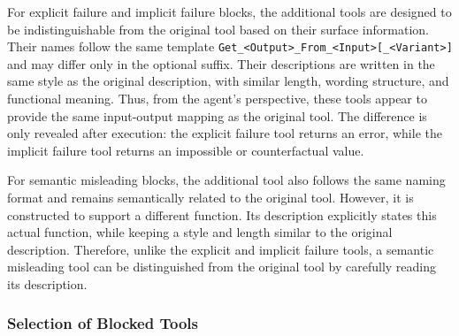 \documentclass{llmxive}
\begin{document}
For explicit failure and implicit failure blocks, the additional tools are designed to be indistinguishable from the original tool based on their surface information. 
Their names follow the same template \texttt{Get\_<Output>\_From\_<Input>[\_<Variant>]} and may differ only in the optional suffix. 
Their descriptions are written in the same style as the original description, with similar length, wording structure, and functional meaning. 
Thus, from the agent's perspective, these tools appear to provide the same input-output mapping as the original tool. 
The difference is only revealed after execution: the explicit failure tool returns an error, while the implicit failure tool returns an impossible or counterfactual value.

For semantic misleading blocks, the additional tool also follows the same naming format and remains semantically related to the original tool. 
However, it is constructed to support a different function. 
Its description explicitly states this actual function, while keeping a style and length similar to the original description. 
Therefore, unlike the explicit and implicit failure tools, a semantic misleading tool can be distinguished from the original tool by carefully reading its description.

\subsubsection{Selection of Blocked Tools}
\label{app:blocked-tool-selection}



\end{document}
